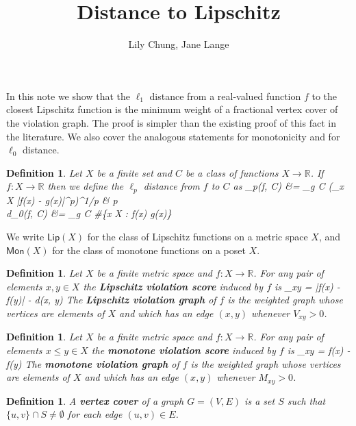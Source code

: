 \documentclass[11pt,a4paper]{article}
\title{Distance to Lipschitz}
\author{
  Lily Chung, Jane Lange
}
\date{}
\newtheorem{definition}[theorem]{Definition}
\newcommand*{\defn}[1]{\textbf{#1}}
\newcommand*{\R}[0]{\mathbb{R}}
\def\[#1\]{\begin{align*}#1\end{align*}}
\newcommand*{\Lip}[0]{\mathsf{Lip}}
\newcommand*{\Mon}[0]{\mathsf{Mon}}
\begin{document}
\maketitle

In this note we show that the $\ell_1$ distance from a real-valued function $f$ to the closest Lipschitz function is the minimum weight of a fractional vertex cover of the violation graph.
The proof is simpler than the existing proof of this fact in the literature.
We also cover the analogous statements for monotonicity and for $\ell_0$ distance.

\begin{definition}
  Let $X$ be a finite set and $C$ be a class of functions $X \to \R$.
  If $f : X \to \R$ then we define the $\ell_p$ distance from $f$ to $C$ as
  \[
  d_p(f, C) &= \inf_{g \in C} \left(\sum_{x \in X} |f(x) - g(x)|^p\right)^{1/p} & p  \\
  d_0(f, C) &= \inf_{g \in C} \#\{x \in X : f(x) \ne g(x)\} \\
  \]
\end{definition}

We write $\Lip(X)$ for the class of Lipschitz functions on a metric space $X$, and $\Mon(X)$ for the class of monotone functions on a poset $X$.

\begin{definition}
  Let $X$ be a finite metric space and $f : X \to \R$.
  For any pair of elements $x, y \in X$ the \defn{Lipschitz violation score} induced by $f$
  is \[V_{xy} = |f(x) - f(y)| - d(x, y)\]
  The \defn{Lipschitz violation graph} of $f$ is the weighted graph whose vertices are elements of $X$
  and which has an edge $(x, y)$ whenever $V_{xy} > 0$.
\end{definition}

\begin{definition}
  Let $X$ be a finite metric space and $f : X \to \R$.
  For any pair of elements $x \le y \in X$ the \defn{monotone violation score} induced by $f$
  is \[M_{xy} = f(x) - f(y)\]
  The \defn{monotone violation graph} of $f$ is the weighted graph whose vertices are elements of $X$
  and which has an edge $(x, y)$ whenever $M_{xy} > 0$.
\end{definition}

\begin{definition}
  A \defn{vertex cover} of a graph $G = (V, E)$ is a set $S$ such that $\{u, v\} \cap S \ne \emptyset$ for each edge $(u, v) \in E$.
\end{definition}
\end{document}
